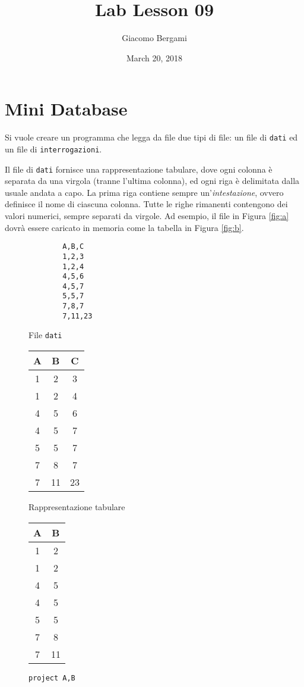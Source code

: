 \documentclass[]{scrartcl}
\title{Lab Lesson 09}
\date{March 20, 2018}
\author{Giacomo Bergami}
\begin{document}
\maketitle



\section*{Mini Database}
Si vuole creare un programma che legga da file due tipi di file: un file di \texttt{dati} ed un file di \texttt{interrogazioni}. 

Il file di \texttt{dati} fornisce una rappresentazione tabulare,
dove ogni colonna è separata da una virgola (tranne l'ultima colonna), ed ogni riga è delimitata dalla usuale andata a capo.
La prima riga contiene sempre un'\textit{intestazione}, ovvero definisce il nome di ciascuna colonna. Tutte le righe rimanenti contengono dei valori numerici, sempre separati da virgole. Ad esempio, il file in Figura \ref{fig:a} 
dovrà essere caricato in memoria come la tabella in Figura \ref{fig:b}.

\begin{figure}[!b]
	\centering
	\begin{minipage}{.3\textwidth}
		\centering
		\begin{verbatim}
		A,B,C
		1,2,3
		1,2,4
		4,5,6
		4,5,7
		5,5,7
		7,8,7
		7,11,23
		\end{verbatim}
		\caption{File \texttt{dati}}
		\label{fig:a}
	\end{minipage}%
	\begin{minipage}{0.4\textwidth}
		\centering
		\begin{tabular}{ccc}
			\toprule
			A &B&C\\
			\midrule
			1&2&3\\
			1&2&4\\
			4&5&6\\
			4&5&7\\
			5&5&7\\
			7&8&7\\
			7&11&23\\
			\bottomrule
		\end{tabular}
	\caption{Rappresentazione tabulare }
		\label{fig:b}
	\end{minipage}\begin{minipage}{0.4\textwidth}
	\centering
	\begin{tabular}{cc}
		\toprule
		A &B\\
		\midrule
		1&2\\
		1&2\\
		4&5\\
		4&5\\
		5&5\\
		7&8\\
		7&11\\
		\bottomrule
	\end{tabular}
	\caption{\texttt{project A,B}}
	\label{fig:h}
\end{minipage}
\end{figure}
\end{document}
